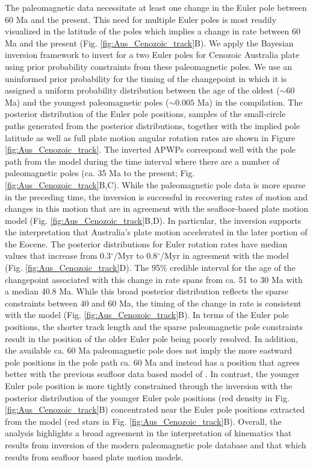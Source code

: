 \documentclass[11pt,letterpaper]{article}
\begin{document}
The paleomagnetic data necessitate at least one change in the Euler pole between 60 Ma and the present. This need for multiple Euler poles is most readily visualized in the latitude of the poles which implies a change in rate between 60 Ma and the present (Fig. \ref{fig:Aus_Cenozoic_track}B). We apply the Bayesian inversion framework to invert for a two Euler poles for Cenozoic Australia plate using prior probability constraints from these paleomagnetic poles. We use an uninformed prior probability for the timing of the changepoint in which it is assigned a uniform probability distribution between the age of the oldest ($\sim60$ Ma) and the youngest paleomagnetic poles ($\sim0.005$ Ma) in the compilation. The posterior distribution of the Euler pole positions, samples of the small-circle paths generated from the posterior distributions, together with the implied pole latitude as well as full plate motion angular rotation rates are shown in Figure \ref{fig:Aus_Cenozoic_track}. The inverted APWPs correspond well with the pole path from the \cite{Muller2016a} model during the time interval where there are a number of paleomagnetic poles (ca. 35 Ma to the present; Fig. \ref{fig:Aus_Cenozoic_track}B,C). While the paleomagnetic pole data is more sparse in the preceding time, the inversion is successful in recovering rates of motion and changes in this motion that are in agreement with the seafloor-based plate motion model (Fig. \ref{fig:Aus_Cenozoic_track}B,D). In particular, the inversion supports the interpretation that Australia's plate motion accelerated in the later portion of the Eocene. The posterior distributions for Euler rotation rates have median values that increase from 0.3$^\circ$/Myr to 0.8$^\circ$/Myr in agreement with the \cite{Muller2016a} model (Fig. \ref{fig:Aus_Cenozoic_track}D). The 95\% credible interval for the age of the changepoint associated with this change in rate spans from ca. 51 to 30 Ma with a median 40.8 Ma. While this broad posterior distribution reflects the sparse constraints between 40 and 60 Ma, the timing of the change in rate is consistent with the \cite{Muller2016a} model (Fig. \ref{fig:Aus_Cenozoic_track}B). In terms of the Euler pole positions, the shorter track length and the sparse paleomagnetic pole constraints result in the position of the older Euler pole being poorly resolved. In addition, the available ca. 60 Ma paleomagnetic pole does not imply the more eastward pole positions in the pole path ca. 60 Ma and instead has a position that agrees better with the previous seafloor data based model of \cite{Seton2012a}. In contrast, the younger Euler pole position is more tightly constrained through the inversion with the posterior distribution of the younger Euler pole positions (red density in Fig. \ref{fig:Aus_Cenozoic_track}B) concentrated near the Euler pole positions extracted from the \cite{Muller2016a} model (red stars in Fig. \ref{fig:Aus_Cenozoic_track}B). Overall, the analysis highlights a broad agreement in the interpretation of kinematics that results from inversion of the modern paleomagnetic pole database and that which results from seafloor based plate motion models. 
\end{document}

